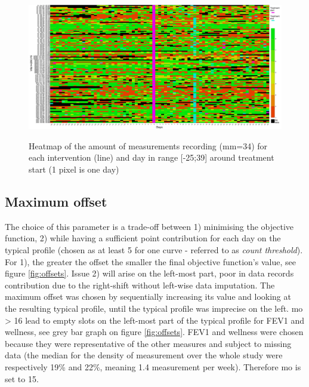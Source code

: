\begin{figure}[!h]
    \caption{Heatmap of the amount of measurements recording (mm=34) for each intervention (line) and day in range [-25;39] around treatment start (1 pixel is one day)}
    \centering
    \includegraphics[width=150mm]{images/heatmapmm.png}
    \label{fig:heatmap}
\end{figure}

\subsection{Maximum offset}
The choice of this parameter is a trade-off between 1) minimising the objective function, 2) while having a sufficient point contribution for each day on the typical profile (chosen as at least 5 for one curve - referred to as \textit{count threshold}). For 1), the greater the offset the smaller the final objective function's value, see figure \ref{fig:offsets}. Issue 2) will arise on the left-most part, poor in data records contribution due to the right-shift without left-wise data imputation. The maximum offset was chosen by sequentially increasing its value and looking at the resulting typical profile, until the typical profile was imprecise on the left. mo > 16 lead to empty slots on the left-most part of the typical profile for FEV1 and wellness, see grey bar graph on figure \ref{fig:offsets}. FEV1 and wellness were chosen because they were representative of the other measures and subject to missing data (the median for the density of measurement over the whole study were respectively 19\% and 22\%, meaning 1.4 measurement per week). Therefore mo is set to 15.

